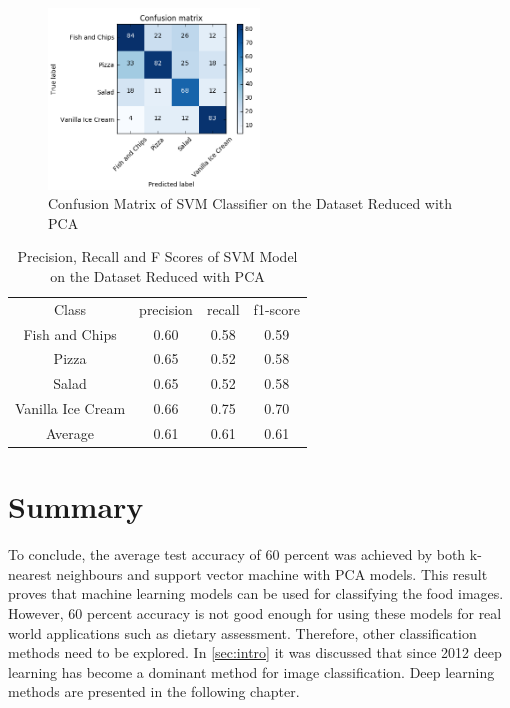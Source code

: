 \begin{figure}[h]
\centering
\includegraphics[width=0.5\textwidth]{Figures/conf_svm_pca.PNG}
\caption{Confusion Matrix of SVM Classifier on the Dataset Reduced with PCA}
\label{fig:conf_svm_pca}
\end{figure}

\begin{table}[h!]
\begin{center}
\begin{tabular}{ |c|c|c|c| } 
 \hline
 Class & precision &   recall & f1-score  \\ 
 Fish and Chips    &   0.60    &  0.58    &  0.59 \\
            Pizza   &    0.65   &   0.52   &   0.58 \\
            Salad    &   0.65    &  0.52   &   0.58  \\
Vanilla Ice Cream     &   0.66    &  0.75   &   0.70   \\ \hline
     Average     &  0.61   &   0.61   &   0.61       \\
 \hline
\end{tabular}
\caption{Precision, Recall and F Scores of SVM Model on the Dataset Reduced with PCA }
\label{table:pca}
\end{center}
\end{table}

\section{Summary}

To conclude, the average test accuracy of 60 percent was achieved by both k-nearest neighbours and support vector machine with PCA models. This result proves that machine learning models can be used for classifying the food images. However, 60 percent accuracy is not good enough for using these models for real world applications such as dietary assessment. Therefore, other classification methods need to be explored. In \autoref{sec:intro} it was discussed that since 2012 deep learning has become a dominant method for image classification.  Deep learning methods are  presented in the following chapter.
